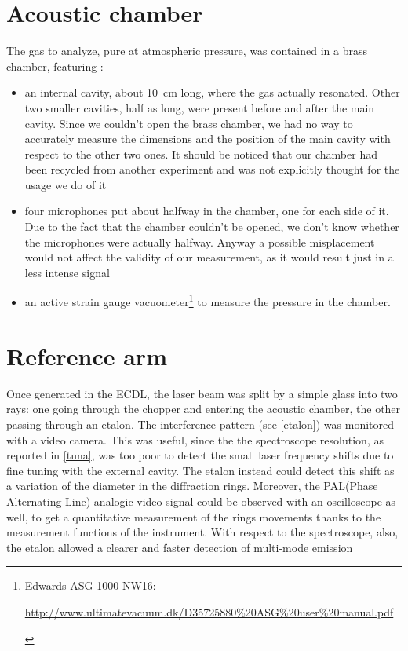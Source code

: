 \section{Acoustic chamber} 
 The gas to analyze, pure  at atmospheric pressure, was contained in a brass chamber, featuring :
\begin{itemize}
	\item an internal cavity, about \mbox{10 cm} long, where the gas actually resonated. Other two smaller cavities, half as long, were present before and after the main cavity. Since we couldn't open the brass chamber, we had no way to accurately measure the dimensions and the position of the main cavity with respect to the other two ones. It should be noticed that our chamber had been recycled from another experiment and was not explicitly thought for the usage we do of it
	\item four microphones put about halfway in the chamber, one for each side of it. Due to the fact that the chamber couldn't be opened, we don't know whether the microphones were actually halfway. Anyway a possible misplacement would not affect the validity of our measurement, as it would result just in a less intense signal
	\item an active strain gauge vacuometer\footnote{Edwards ASG-1000-NW16:\vspace{-10pt}\begin{flushright}\url{http://www.ultimatevacuum.dk/D35725880\%20ASG\%20user\%20manual.pdf }\end{flushright}} to measure the pressure in the chamber. 
\end{itemize}

\section{Reference arm}\label{referencearm}
Once generated in the ECDL, the laser beam was split by a simple glass into two rays: one going through the chopper and entering the acoustic chamber, the other passing  through an etalon. The interference pattern (see \cref{etalon}) was monitored with a video camera. This was useful, since the the spectroscope resolution, as reported in \cref{tuna}, was too poor to detect the small laser frequency shifts due to fine tuning with the external cavity. The etalon instead could detect this shift as a variation of the diameter in the diffraction rings. Moreover, the PAL(Phase Alternating Line) analogic video signal could be observed with an oscilloscope as well, to get a quantitative measurement of the rings movements thanks to the measurement functions of the instrument. With respect to the spectroscope, also, the etalon allowed a clearer and faster detection of multi-mode emission 